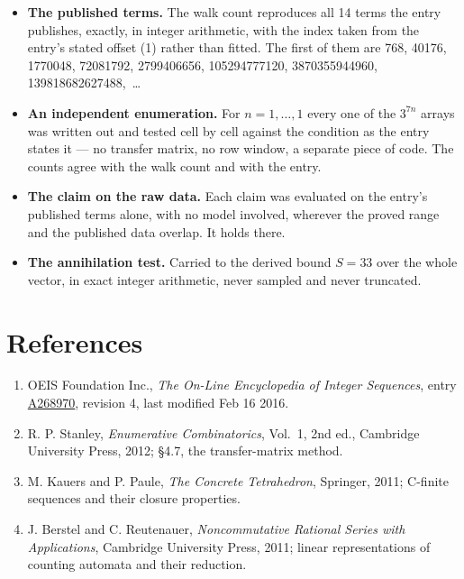 \documentclass[11pt]{article}
\theoremstyle{definition}
\begin{document}
\begin{itemize}

\item {\bfseries The published terms.} The walk count reproduces all 14 terms the entry publishes, exactly, in integer arithmetic, with the index taken from the entry's stated offset (1) rather than fitted. The first of them are 768, 40176, 1770048, 72081792, 2799406656, 105294777120, 3870355944960, 139818682627488,~\dots

\item {\bfseries An independent enumeration.} For $n = 1,\dots,1$ every one of the $3^{7n}$ arrays was written out and tested cell by cell against the condition as the entry states it --- no transfer matrix, no row window, a separate piece of code. The counts agree with the walk count and with the entry.

\item {\bfseries The claim on the raw data.} Each claim was evaluated on the entry's published terms alone, with no model involved, wherever the proved range and the published data overlap. It holds there.

\item {\bfseries The annihilation test.} Carried to the derived bound $S = 33$ over the whole vector, in exact integer arithmetic, never sampled and never truncated.

\end{itemize}

\section{References}

\begin{enumerate}

\item OEIS Foundation Inc., \emph{The On-Line Encyclopedia of Integer Sequences}, entry \href{https://oeis.org/A268970}{A268970}, revision 4, last modified Feb 16 2016.

\item R. P. Stanley, \emph{Enumerative Combinatorics}, Vol.~1, 2nd ed., Cambridge University Press, 2012; \S4.7, the transfer-matrix method.

\item M. Kauers and P. Paule, \emph{The Concrete Tetrahedron}, Springer, 2011; C-finite sequences and their closure properties.

\item J. Berstel and C. Reutenauer, \emph{Noncommutative Rational Series with Applications}, Cambridge University Press, 2011; linear representations of counting automata and their reduction.

\end{enumerate}
\end{document}
